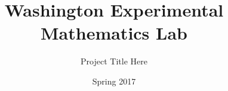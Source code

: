 \documentclass{beamer}
\title
{Washington Experimental Mathematics Lab} %
\subtitle
{Project Title Here}
\date{Spring 2017}
\institute[University of Washington] %
{
  Department of Mathematics\\
  University of Washington}
\begin{document}
\begin{frame}
  \titlepage
\end{frame}










\end{document}
